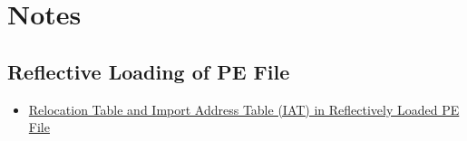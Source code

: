 \section{Notes}

\subsection{Reflective Loading of PE File}

\begin{itemize}
    \item \href{https://owl4444.github.io/2023/09/05/Relocation_Table_and_IAT_Fixing/}{Relocation Table and Import Address Table (IAT) in Reflectively Loaded PE File}
\end{itemize}